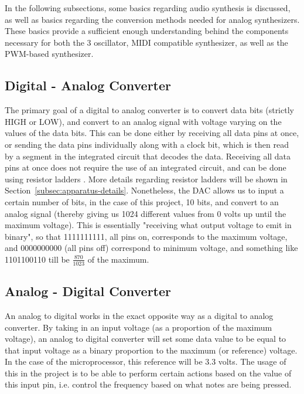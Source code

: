 
In the following subsections, some basics regarding audio synthesis is discussed, as well as basics regarding the conversion methods needed for analog synthesizers. These basics provide a sufficient enough understanding behind the components necessary for both the 3 oscillator, MIDI compatible synthesizer, as well as the PWM-based synthesizer. 

\subsection{Digital - Analog Converter}\label{subsec:digital---analog-converter}

The primary goal of a digital to analog converter is to convert data bits (strictly HIGH or LOW), and convert to an analog signal with voltage varying on the values of the data bits.
This can be done either by receiving all data pins at once, or sending the data pins individually along with a clock bit, which is then read by a segment in the integrated circuit that decodes the data.
Receiving all data pins at once does not require the use of an integrated circuit, and can be done using resistor ladders \cite{TERRELL1996337}. 
More details regarding resistor ladders will be shown in Section~\ref{subsec:apparatus-details}.
Nonetheless, the DAC allows us to input a certain number of bits, in the case of this project, 10 bits, and convert to an analog signal (thereby giving us 1024 different values from 0 volts up until the maximum voltage).
This is essentially "receiving what output voltage to emit in binary", so that 1111111111, all pins on, corresponds to the maximum voltage, and 0000000000 (all pins off) correspond to minimum voltage, and something like 1101100110 till be $\frac{870}{1023}$ of the maximum. 

\subsection{Analog - Digital Converter}\label{subsec:analog---digital-converter}

An analog to digital works in the exact opposite way as a digital to analog converter.
By taking in an input voltage (as a proportion of the maximum voltage), an analog to digital converter will set some data value to be equal to that input voltage as a binary proportion to the maximum (or reference) voltage.
In the case of the microprocessor, this reference will be 3.3 volts.
The usage of this in the project is to be able to perform certain actions based on the value of this input pin, i.e. control the frequency based on what notes are being pressed. 

